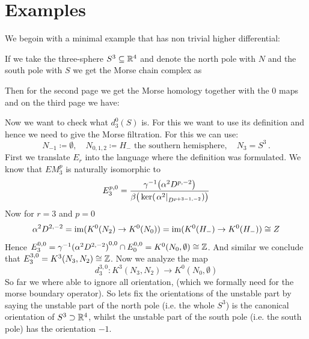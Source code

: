 \section{Examples}
	We begoin with a minimal example that has non trivial higher differential:
	\begin{example}
	If we take the three-sphere $S^3\subseteq \mathbb{R}^4$ and denote the north pole with $N$ and the south pole with $S$ we get the Morse chain complex as
	\begin{center}
	\end{center}Then for the second page we get the Morse homology together with the 0 maps and on the third page we have: 
	\begin{center}
	\end{center}
	Now we want to check what $d_3^0(S)$ is. For this we want to use its definition and hence we need to give the Morse filtration. For this we can use:
	\begin{equation*}
		N_{-1}\coloneq\emptyset,\quad N_{0,1,2}\coloneq H_- \text{ the southern hemisphere},\quad  N_3=S^3\,.
	\end{equation*}
	First we translate $E_r$ into the language where the definition was formulated. 
	We know that $EM_3^p$ is naturally isomorphic to $$E^{p,0}_3=\frac{\gamma^{-1}\big(\alpha^2D^{p,-2}\big)}{\beta\big(\ker(\left.\alpha^2\right|_{D^{p+3-1,-2}})\big)}$$
	Now for $r=3$ and $p=0$
	\begin{equation*}
		\alpha^2D^{2,-2}=\mathrm{im} (K^0(N_2)\to K^0(N_0))=\mathrm{im}(K^0(H_-)\to K^0(H_-))\cong Z
	\end{equation*} Hence $E^{0,0}_3={\gamma^{-1}(\alpha^2D^{2,-2})}^{0,0}\cap E^{0,0}_0= K^0(N_0,\emptyset)\cong \mathbb{Z}$. And similar we conclude that $E^{3,0}_3=K^3(N_3,N_2)\cong\mathbb{Z}$. 
	Now we analyze the map 
	\begin{equation*}
		d^{3,0}_3:  K^3(N_3,N_2) \to K^0(N_0,\emptyset) 
	\end{equation*} So far we where able to ignore all orientation, (which we formally need for the morse boundary operator). So lets fix the orientations of the unstable part by saying the unstable part of the north pole (i.e. the whole $S^3$) is the canonical orientation of $S^3\supset \mathbb{R}^4$, whilst the unstable part of the south pole (i.e. the south pole) has the orientation $-1$. 
	

\end{example}
